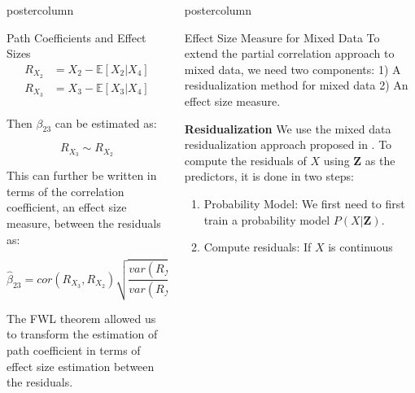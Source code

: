 \documentclass{beamer}
\newlength{\columnheight}
\begin{document}
\begin{frame}
\begin{columns}
\begin{column}{.33\textwidth}
\begin{beamercolorbox}[center]{postercolumn}
\begin{minipage}{.98\textwidth}
{\begin{myblock}{Path Coefficients and Effect Sizes}
		\begin{equation*}
			\begin{split}
				R_{X_2} &= X_2 - \mathbb{E}[X_2 | X_4] \\
				R_{X_3} &= X_3 - \mathbb{E}[X_3 | X_4] \\
			\end{split}
		\end{equation*}

		Then $ \beta_{23} $ can be estimated as:

		\begin{equation*}
			R_{X_3} \sim R_{X_2}
		\end{equation*}

		This can further be written in terms of the correlation
		coefficient, an effect size measure, between the residuals as:

		\begin{equation*}
			\hat{\beta}_{23} = cor(R_{X_3}, R_{X_2}) \sqrt{\frac{var(R_{X_3})}{var(R_{X_2})}}
		\end{equation*}
		
		The FWL theorem allowed us to transform the estimation of path coefficient in terms of
		effect size estimation between the residuals.
		
	\end{myblock}\vfill
		}\end{minipage}\end{beamercolorbox}
	\end{column}


	\begin{column}{.33\textwidth}
		\begin{beamercolorbox}[center]{postercolumn}
			\begin{minipage}{.98\textwidth} %
				\parbox[t][\columnheight]{\textwidth}{ %
	\begin{myblock}{Effect Size Measure for Mixed Data}
		To extend the partial correlation approach to mixed data, we need two components: 1) A residualization method for mixed data 2) An effect size
		measure.

		\textbf{Residualization}
		We use the mixed data residualization approach proposed in \citet{Ankan2023}. To compute the residuals of $ X $ using $ \bm{Z} $ as the predictors, it is done in two steps:
		\begin{enumerate}
			\item Probability Model: We first need to first train a probability model $ P(X | \bm{Z}) $.
			\item Compute residuals: 
				If $ X $ is continuous 
		\end{enumerate}


\end{myblock}}
\end{minipage}
\end{beamercolorbox}
\end{column}
\end{columns}
\end{frame}
\end{document}
